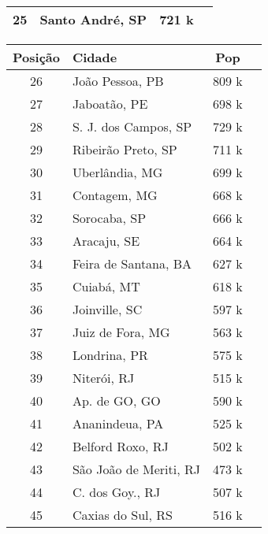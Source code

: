\documentclass[12pt]{article}
\begin{document}
\begin{enumerate}[label=\textbf{Q\arabic*}]
\begin{minipage}{0.50\textwidth}
\begin{tabular}{@{}clcr@{}}
                  25      & Santo André, SP     & 721 k   \\
                  \bottomrule
              \end{tabular}
          \end{minipage}
          \hfill
          \begin{minipage}{0.50\textwidth}
              \begin{tabular}{@{}clcr@{}}
                  \toprule
                  Posição & Cidade                 & Pop   \\
                  \midrule
                  26      & João Pessoa, PB        & 809 k \\
                  27      & Jaboatão, PE           & 698 k \\
                  28      & S. J. dos Campos, SP   & 729 k \\
                  29      & Ribeirão Preto, SP     & 711 k \\
                  30      & Uberlândia, MG         & 699 k \\
                  31      & Contagem, MG           & 668 k \\
                  32      & Sorocaba, SP           & 666 k \\
                  33      & Aracaju, SE            & 664 k \\
                  34      & Feira de Santana, BA   & 627 k \\
                  35      & Cuiabá, MT             & 618 k \\
                  36      & Joinville, SC          & 597 k \\
                  37      & Juiz de Fora, MG       & 563 k \\
                  38      & Londrina, PR           & 575 k \\
                  39      & Niterói, RJ            & 515 k \\
                  40      & Ap. de GO, GO          & 590 k \\
                  41      & Ananindeua, PA         & 525 k \\
                  42      & Belford Roxo, RJ       & 502 k \\
                  43      & São João de Meriti, RJ & 473 k \\
                  44      & C. dos Goy., RJ        & 507 k \\
                  45      & Caxias do Sul, RS      & 516 k \\

\end{tabular}
\end{minipage}
\end{enumerate}
\end{document}
